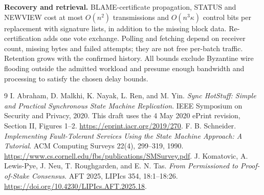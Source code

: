 \documentclass[11pt,a4paper,onecolumn]{article}
\begin{document}
\textbf{Recovery and retrieval.}
BLAME-certificate propagation, STATUS and NEWVIEW cost at most
$O(n^2)$ transmissions and $O(n^3\kappa)$ control bits per replacement with
signature lists, in addition to the missing block data. Re-certification adds
one vote exchange. Polling and fetching depend on receiver count, missing
bytes and failed attempts; they are not free per-batch traffic.
Retention grows with the confirmed history. All bounds exclude Byzantine
wire flooding outside the admitted workload and presume enough bandwidth
and processing to satisfy the chosen delay bounds.

\begin{thebibliography}{9}\small
\setlength{\itemsep}{3pt}
I. Abraham, D. Malkhi, K. Nayak, L. Ren, and M. Yin.
\emph{Sync HotStuff: Simple and Practical Synchronous State Machine Replication}.
IEEE Symposium on Security and Privacy, 2020.
This draft uses the 4 May 2020 ePrint revision, Section II, Figures 1--2.
\url{https://eprint.iacr.org/2019/270}.
F. B. Schneider.
\emph{Implementing Fault-Tolerant Services Using the State Machine Approach:
A Tutorial}. ACM Computing Surveys 22(4), 299--319, 1990.
\url{https://www.cs.cornell.edu/fbs/publications/SMSurvey.pdf}.
J. Komatovic, A. Lewis-Pye, J. Neu, T. Roughgarden, and E. N. Tas.
\emph{From Permissioned to Proof-of-Stake Consensus}.
AFT 2025, LIPIcs 354, 18:1--18:26.
\url{https://doi.org/10.4230/LIPIcs.AFT.2025.18}.
\end{thebibliography}
\end{document}
